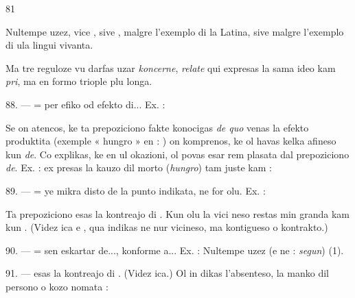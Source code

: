 \begin{VUpage}[85]{81}

Nultempe uzez, vice , sive , malgre l'exemplo di la\nl
Latina, sive  malgre l'exemplo di ula lingui vivanta.

Ma tre reguloze vu darfas uzar \textit{koncerne}, \textit{relate} qui\nl
expresas la sama ideo kam \textit{pri}, ma en formo triople plu\nl
longa.

\VUblanc{5.53pt}%
88. ---  = per efiko od efekto di... Ex. : \nl
{}\nl
{}\nl
{}

Se on atencos, ke ta prepoziciono fakte konocigas \textit{de quo}\nl
venas la efekto produktita (exemple « hungro » en : \nl
{}) on komprenos, ke ol havas kelka afineso\nl
kun \textit{de}. Co explikas, ke en ul okazioni, ol povas esar rem\cc
plasata dal prepoziciono \textit{de}. Ex. :  ex\cc
presas la kauzo dil morto (\textit{hungro}) tam juste kam : \nl
{}

\VUblanc{5.53pt}%
89. ---  = ye mikra disto de la punto indikata,\nl
ne for olu. Ex. : \nl
{}

Ta prepoziciono esas la kontreajo di . Kun olu la vici\cc
neso restas min granda kam kun . (Videz ica e , qua\nl
indikas ne nur vicineso, ma kontigueso o kontrakto.)

\VUblanc{5.60pt}%
90. ---  = sen eskartar de..., konforme a... Ex. :\nl
{}\nl
{}\nl
{}\nl
{}\cc
{} Nultempe uzez\nl
{}\nl
{} (e ne : \textit{segun})  (1).

\VUblanc{5.65pt}%
91. ---  esas la kontreajo di . (Videz ica.) Ol in\cc
dikas l'absenteso, la manko dil persono o kozo nomata :\nl
{}
\end{VUpage}

